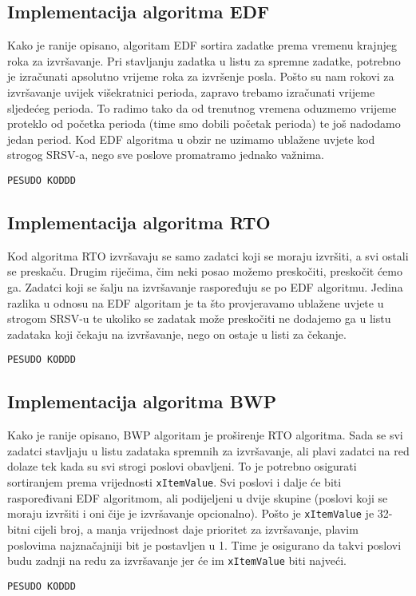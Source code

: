 \documentclass[../zavrsni.tex]{subfiles}
\begin{document}
\subsection{Implementacija algoritma EDF}

Kako je ranije opisano, algoritam EDF sortira zadatke prema vremenu krajnjeg roka za izvršavanje. Pri stavljanju zadatka u 
listu za spremne zadatke, potrebno je izračunati apsolutno vrijeme roka za izvršenje posla. Pošto su nam rokovi za izvršavanje
uvijek višekratnici perioda, zapravo trebamo izračunati vrijeme sljedećeg perioda. To radimo tako da od trenutnog vremena 
oduzmemo vrijeme proteklo od početka perioda (time smo dobili početak perioda) te još nadodamo jedan period. Kod EDF algoritma
u obzir ne uzimamo ublažene uvjete kod strogog SRSV-a, nego sve poslove promatramo jednako važnima.

\begin{lstlisting}[style=CStyle,caption={Pretprocesorska naredba za uključenje periodičnih zadataka},captionpos=b]
PESUDO KODDD
\end{lstlisting}


\subsection{Implementacija algoritma RTO}

Kod algoritma RTO izvršavaju se samo zadatci koji se moraju izvršiti, a svi ostali se preskaču. Drugim riječima, čim neki posao 
možemo preskočiti, preskočit ćemo ga. Zadatci koji se šalju na izvršavanje raspoređuju se po EDF algoritmu. Jedina razlika u odnosu
na EDF algoritam je ta što provjeravamo ublažene uvjete u strogom SRSV-u te ukoliko se zadatak može preskočiti ne dodajemo ga u 
listu zadataka koji čekaju na izvršavanje, nego on ostaje u listi za čekanje. 

\begin{lstlisting}[style=CStyle,caption={Pretprocesorska naredba za uključenje periodičnih zadataka},captionpos=b]
  PESUDO KODDD
\end{lstlisting}

\subsection{Implementacija algoritma BWP}

Kako je ranije opisano, BWP algoritam je proširenje RTO algoritma. Sada se svi zadatci stavljaju u listu zadataka spremnih za izvršavanje,
ali plavi zadatci na red dolaze tek kada su svi strogi poslovi obavljeni. To je potrebno osigurati sortiranjem prema vrijednosti
\texttt{xItemValue}. Svi poslovi i dalje će biti raspoređivani EDF algoritmom, ali podijeljeni u dvije skupine (poslovi koji se moraju
izvršiti i oni čije je izvršavanje opcionalno). Pošto je \texttt{xItemValue} je 32-bitni cijeli broj, a manja vrijednost daje prioritet
za izvršavanje, plavim poslovima najznačajniji bit je postavljen u 1. Time je osigurano da takvi poslovi budu 
zadnji na redu za izvršavanje jer će im \texttt{xItemValue} biti najveći.  

\begin{lstlisting}[style=CStyle,caption={Pretprocesorska naredba za uključenje periodičnih zadataka},captionpos=b]
  PESUDO KODDD
\end{lstlisting}
\end{document}
